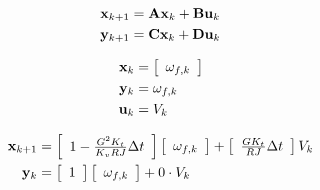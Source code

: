 \begin{align*}
  \mathbf{x}_{k+1} &= \mathbf{A} \mathbf{x}_k + \mathbf{B} \mathbf{u}_k \\
  \mathbf{y}_{k+1} &= \mathbf{C} \mathbf{x}_k + \mathbf{D} \mathbf{u}_k
\end{align*}

\begin{align*}
  \mathbf{x}_k &= \left[
  \begin{array}{c}
    \omega_{f,k}
  \end{array}
  \right] \\
  \mathbf{y}_k &= \omega_{f,k} \\
  \mathbf{u}_k &= V_k
\end{align*}

\begin{align}
  \mathbf{x}_{k+1} &= \left[
  \begin{array}{c}
    1 - \frac{G^2 K_t}{K_v RJ} \Delta t
  \end{array}
  \right] \left[
  \begin{array}{c}
    \omega_{f,k}
  \end{array}
  \right] + \left[
  \begin{array}{c}
    \frac{G K_t}{RJ} \Delta t
  \end{array}
  \right] V_k \\
  \mathbf{y}_k &= \left[
  \begin{array}{c}
    1
  \end{array}
  \right] \left[
  \begin{array}{c}
    \omega_{f,k}
  \end{array}
  \right] + 0 \cdot V_k
\end{align}
